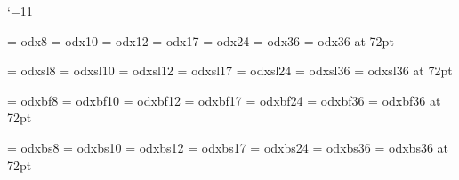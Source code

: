%

\catcode`\@=11




\font\odx@VIII     = odx8
\font\odx@X        = odx10
\font\odx@XII      = odx12
\font\odx@XVII     = odx17
\font\odx@XXIV     = odx24
\font\odx@XXXVI    = odx36
\font\odx@LXXII    = odx36 at 72pt

\font\odsxl@VIII   = odxsl8
\font\odxsl@X      = odxsl10
\font\odxsl@XII    = odxsl12
\font\odxsl@XVII   = odxsl17
\font\odxsl@XXIV   = odxsl24
\font\odxsl@XXXVI  = odxsl36
\font\odxsl@LXXII  = odxsl36 at 72pt

\font\odxbf@VIII   = odxbf8
\font\odxbf@X      = odxbf10
\font\odxbf@XII    = odxbf12
\font\odxbf@XVII   = odxbf17
\font\odxbf@XXIV   = odxbf24
\font\odxbf@XXXVI  = odxbf36
\font\odxbf@LXXII  = odxbf36 at 72pt

\font\odxbs@VIII   = odxbs8
\font\odxbs@X      = odxbs10
\font\odxbs@XII    = odxbs12
\font\odxbs@XVII   = odxbs17
\font\odxbs@XXIV   = odxbs24
\font\odxbs@XXXVI  = odxbs36
\font\odxbs@LXXII  = odxbs36 at 72pt

\def\odxVIII{\odx@VIII\baselineskip=9pt}
\def\odx{\odx@X\baselineskip=12pt}
\def\odxXII{\odx@XII\baselineskip=15pt}
\def\odxXVII{\odx@XVII\baselineskip=20pt}
\def\odxXXIV{\odx@XXIV\baselineskip=26pt}
\def\odxXXXVI{\odx@XXXVI\baselineskip=36pt}
\def\odxLXXII{\odx@LXXII\baselineskip=72pt}

\def\odxslVIII{\odxsl@VIII\baselineskip=9pt}
\def\odxsl{\odxsl@X\baselineskip=12pt}
\def\odxslXII{\odxsl@XII\baselineskip=15pt}
\def\odxslXVII{\odxsl@XVII\baselineskip=20pt}
\def\odxslXXIV{\odxsl@XXIV\baselineskip=26pt}
\def\odxslXXXVI{\odxsl@XXXVI\baselineskip=36pt}
\def\odxslLXXII{\odxsl@LXXII\baselineskip=72pt}

\def\odxbfVIII{\odxbf@VIII\baselineskip=9pt}
\def\odxbf{\odxbf@X\baselineskip=12pt}
\def\odxbfXII{\odxbf@XII\baselineskip=15pt}
\def\odxbfXVII{\odxbf@XVII\baselineskip=20pt}
\def\odxbfXXIV{\odxbf@XXIV\baselineskip=26pt}
\def\odxbfXXXVI{\odxbf@XXXVI\baselineskip=36pt}
\def\odxbfLXXII{\odxbf@LXXII\baselineskip=72pt}

\def\odxbsVIII{\odxbs@VIII\baselineskip=9pt}
\def\odxbs{\odxbs@X\baselineskip=12pt}
\def\odxbsXII{\odxbs@XII\baselineskip=15pt}
\def\odxbsXVII{\odxbs@XVII\baselineskip=20pt}
\def\odxbsXXIV{\odxbs@XXIV\baselineskip=26pt}
\def\odxbsXXXVI{\odxbs@XXXVI\baselineskip=36pt}
\def\odxbsLXXII{\odxbs@LXXII\baselineskip=72pt}



